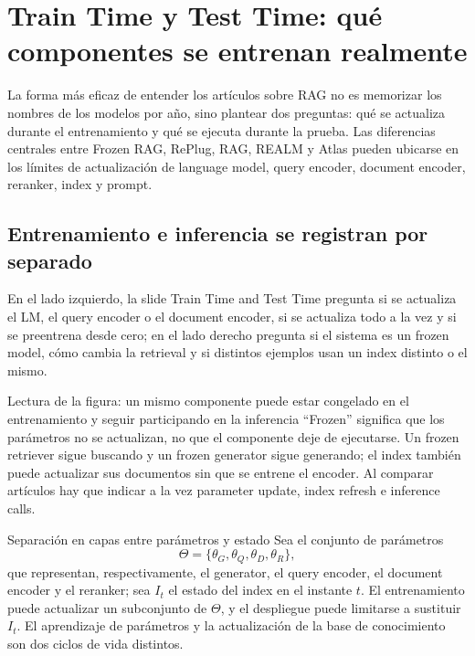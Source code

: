 \section{Train Time y Test Time: qué componentes se entrenan realmente}

La forma más eficaz de entender los artículos sobre RAG no es memorizar los nombres de los modelos por año, sino plantear dos preguntas: qué se actualiza durante el entrenamiento y qué se ejecuta durante la prueba. Las diferencias centrales entre Frozen RAG, RePlug, RAG, REALM y Atlas pueden ubicarse en los límites de actualización de language model, query encoder, document encoder, reranker, index y prompt.

\subsection{Entrenamiento e inferencia se registran por separado}

En el lado izquierdo, la slide Train Time and Test Time pregunta si se actualiza el LM, el query encoder o el document encoder, si se actualiza todo a la vez y si se preentrena desde cero; en el lado derecho pregunta si el sistema es un frozen model, cómo cambia la retrieval y si distintos ejemplos usan un index distinto o el mismo.


\begin{knowledgebox}{Lectura de la figura: un mismo componente puede estar congelado en el entrenamiento y seguir participando en la inferencia}
``Frozen'' significa que los parámetros no se actualizan, no que el componente deje de ejecutarse. Un frozen retriever sigue buscando y un frozen generator sigue generando; el index también puede actualizar sus documentos sin que se entrene el encoder. Al comparar artículos hay que indicar a la vez parameter update, index refresh e inference calls.
\end{knowledgebox}

\begin{importantbox}{Separación en capas entre parámetros y estado}
Sea el conjunto de parámetros
\[
\Theta=\{\theta_G,\theta_Q,\theta_D,\theta_R\},
\]
que representan, respectivamente, el generator, el query encoder, el document encoder y el reranker; sea $I_t$ el estado del index en el instante $t$. El entrenamiento puede actualizar un subconjunto de $\Theta$, y el despliegue puede limitarse a sustituir $I_t$. El aprendizaje de parámetros y la actualización de la base de conocimiento son dos ciclos de vida distintos.
\end{importantbox}


